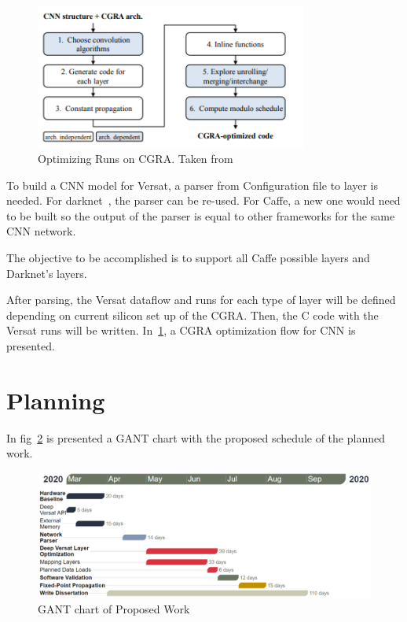 \begin{figure}[!htbp]
    \centering
    \includegraphics[width=0.8\textwidth]{Figures/cgraopt.png}
    \caption{Optimizing Runs on CGRA. Taken from ~\cite{cgraopt}}
    \label{figure:cgraopt}
\end{figure}

To build a CNN model for Versat, a parser from Configuration file to layer is needed. For darknet~\cite{darknet}, the parser can be re-used.
For Caffe, a new one would need to be built so the output of the parser is equal to other frameworks for the same CNN network.

The objective to be accomplished is to support all Caffe possible layers and Darknet's layers.

After parsing, the Versat dataflow and runs for each type of layer will be defined depending on current silicon set up of the CGRA. Then,
the C code with the Versat runs will be written. In~\ref{figure:cgraopt}, a CGRA optimization flow for CNN is presented.

\newpage
\section{Planning}

In fig~\ref{figure:gant} is presented a GANT chart with the proposed schedule of the planned work.

\begin{figure}[!htbp]
    \includegraphics[width=1\textwidth]{Figures/GANT2.png}
    \caption{GANT chart of Proposed Work}
    \label{figure:gant}
\end{figure}





